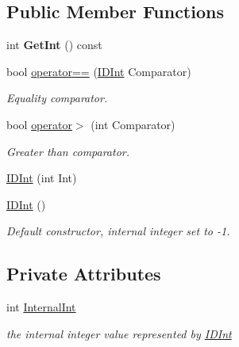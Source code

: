 \subsection*{Public Member Functions}
\begin{DoxyCompactItemize}
\item 
\mbox{\label{class_i_d_int_a3c40e609e12caab2063aa7f3ff8b8ea7}} 
int {\bfseries Get\+Int} () const
\item 
\mbox{\label{class_i_d_int_ae083414184db298f8abbfbe791db82de}} 
bool \mbox{\hyperlink{class_i_d_int_ae083414184db298f8abbfbe791db82de}{operator==}} (\mbox{\hyperlink{class_i_d_int}{I\+D\+Int}} Comparator)
\begin{DoxyCompactList}\small\item\em Equality comparator. \end{DoxyCompactList}\item 
\mbox{\label{class_i_d_int_ae309faa19a8c2f2a6f5e16c7cd64f184}} 
bool \mbox{\hyperlink{class_i_d_int_ae309faa19a8c2f2a6f5e16c7cd64f184}{operator$>$}} (int Comparator)
\begin{DoxyCompactList}\small\item\em Greater than comparator. \end{DoxyCompactList}\item 
\mbox{\hyperlink{class_i_d_int_ae51fdc864457738e484bb91c829b082c}{I\+D\+Int}} (int Int)
\item 
\mbox{\label{class_i_d_int_ae0583f8509efd2cff2fa60b52e7b5cea}} 
\mbox{\hyperlink{class_i_d_int_ae0583f8509efd2cff2fa60b52e7b5cea}{I\+D\+Int}} ()
\begin{DoxyCompactList}\small\item\em Default constructor, internal integer set to -\/1. \end{DoxyCompactList}\end{DoxyCompactItemize}
\subsection*{Private Attributes}
\begin{DoxyCompactItemize}
\item 
\mbox{\label{class_i_d_int_af9b9224cae0ea5f7ce15c83e6b94d00a}} 
int \mbox{\hyperlink{class_i_d_int_af9b9224cae0ea5f7ce15c83e6b94d00a}{Internal\+Int}}
\begin{DoxyCompactList}\small\item\em the internal integer value represented by \mbox{\hyperlink{class_i_d_int}{I\+D\+Int}} \end{DoxyCompactList}\end{DoxyCompactItemize}


